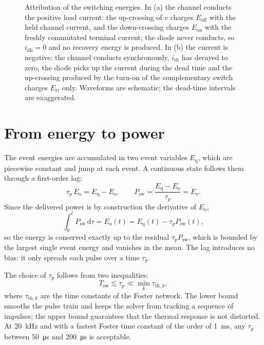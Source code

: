 \documentclass[11pt,a4paper]{article}
\newcommand{\Eon}{E_\mathrm{on}}
\newcommand{\Eoff}{E_\mathrm{off}}
\newcommand{\Err}{E_\mathrm{rr}}
\newcommand{\dd}{\mathrm{d}}
\begin{document}
\begin{figure}[h]
\begin{tikzpicture}[x=1mm,y=1mm,>=Stealth,line width=0.4pt]
\end{tikzpicture}
\caption{Attribution of the switching energies. In (a) the channel conducts the
positive load current: the up-crossing of $v$ charges $\Eoff$ with the held
channel current, and the down-crossing charges $\Eon$ with the freshly
commutated terminal current; the diode never conducts, so $i_\mathrm{dh}=0$ and
no recovery energy is produced. In (b) the current is negative: the channel
conducts synchronously, $i_\mathrm{th}$ has decayed to zero, the diode picks up
the current during the dead time and the up-crossing produced by the turn-on of
the complementary switch charges $\Err$ only. Waveforms are schematic; the
dead-time intervals are exaggerated.}
\label{fig:timing}
\end{figure}

\section{From energy to power}

The event energies are accumulated in two event variables $E_\mathrm{q}$, which
are piecewise constant and jump at each event. A continuous state follows them
through a first-order lag:
\begin{equation}
  \tau_p\,\dot E_\mathrm{o} = E_\mathrm{q} - E_\mathrm{o},
  \qquad
  P_\mathrm{sw} = \frac{E_\mathrm{q} - E_\mathrm{o}}{\tau_p} = \dot E_\mathrm{o}.
\end{equation}
Since the delivered power is by construction the derivative of $E_\mathrm{o}$,
\begin{equation}
  \int_{0}^{t} P_\mathrm{sw}\,\dd\tau = E_\mathrm{o}(t)
  = E_\mathrm{q}(t) - \tau_p P_\mathrm{sw}(t),
\end{equation}
so the energy is conserved exactly up to the residual $\tau_p P_\mathrm{sw}$,
which is bounded by the largest single event energy and vanishes in the mean.
The lag introduces no bias: it only spreads each pulse over a time $\tau_p$.

The choice of $\tau_p$ follows from two inequalities:
\begin{equation}
  T_\mathrm{sw} \lesssim \tau_p \ll \min_k \tau_{\mathrm{th},k},
\end{equation}
where $\tau_{\mathrm{th},k}$ are the time constants of the Foster network. The
lower bound smooths the pulse train and keeps the solver from tracking a
sequence of impulses; the upper bound guarantees that the thermal response is
not distorted. At \SI{20}{\kilo\hertz} and with a fastest Foster time constant
of the order of \SI{1}{\milli\second}, any $\tau_p$ between \SI{50}{\micro\second}
and \SI{200}{\micro\second} is acceptable.
\end{document}
